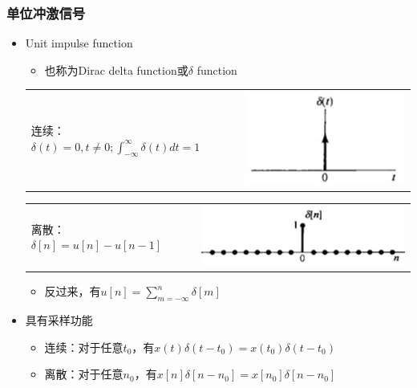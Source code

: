 \documentclass[CJKutf8,dvipsnames,table]{beamer}
\begin{document}
\begin{CJK*}{UTF8}{song}
\begin{frame}
\begin{itemize}
    \end{itemize}
  \end{frame}  

  \begin{frame}
    \frametitle{单位冲激信号}
    \begin{itemize}
    \item Unit impulse function
    \begin{itemize}
    \item 也称为Dirac delta function或$\delta$ function
    \end{itemize}  
     
	\begin{tabular}{ll}
	\raisebox{-.5\height}

    连续：
    \begin{math}
	\delta(t) = 0, t \neq 0; \int_{-\infty}^{\infty}\delta(t)dt=1 
	\end{math}

&
    \includegraphics[valign=m,scale=.4]{cdelta}    \\
    \end{tabular}   

	\begin{tabular}{ll}
	\raisebox{-.5\height}

    离散：$\delta[n]=u[n]-u[n-1]$	

&
    \includegraphics[valign=m,scale=.4]{ddelta}    \\
    \end{tabular}   
    
    \begin{itemize}
    \item 反过来，有$u[n]=\sum_{m=-\infty}^{n}\delta[m]$   
    \end{itemize}
    
	\item 具有采样功能
	\begin{itemize}
	\item 连续：对于任意$t_0$，有$x(t)\delta(t-t_0)=x(t_0)\delta(t-t_0)$
	\item 离散：对于任意$n_0$，有$x[n]\delta[n-n_0]=x[n_0]\delta[n-n_0]$
	\end{itemize}
    \end{itemize}
  \end{frame}


\end{CJK*}
\end{document}
